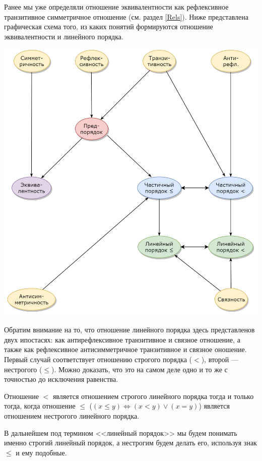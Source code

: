 \begin{enumerate}
{\item Ранее мы уже определяли отношение эквивалентности как рефлексивное транзитивное симметричное отношение (см. раздел \ref{Rels}). Ниже представлена графическая схема того, из каких понятий формируются отношение эквивалентности и линейного порядка.
\begin{center}
\includegraphics[scale=0.4]{RelOrder.png}
\end{center}

Обратим внимание на то, что отношение линейного порядка здесь представленов двух ипостасях: как антирефлексивное транзитивное и связное отношение, а также как рефлексивное антисимметричное транзитивное и связное оношение. Первый случай соответствует отношению строгого порядка ($<$), второй --- нестрогого ($\le$). Можно доказать, что это на самом деле одно и то же с точностью до исключения равенства.

\begin{lem} Отношение $<$ является отношением строгого линейного порядка тогда и только тогда, когда отношение $\le$ ($(x\le y)\Leftrightarrow (x<y)\lor (x=y)$) является отношением нестрогого линейного порядка.
\end{lem}

В дальнейшем под термином <<линейный порядок>> мы будем понимать именно строгий линейный порядок, а нестрогим будем делать его, используя знак $\le$ и ему подобные.}


\end{enumerate}
